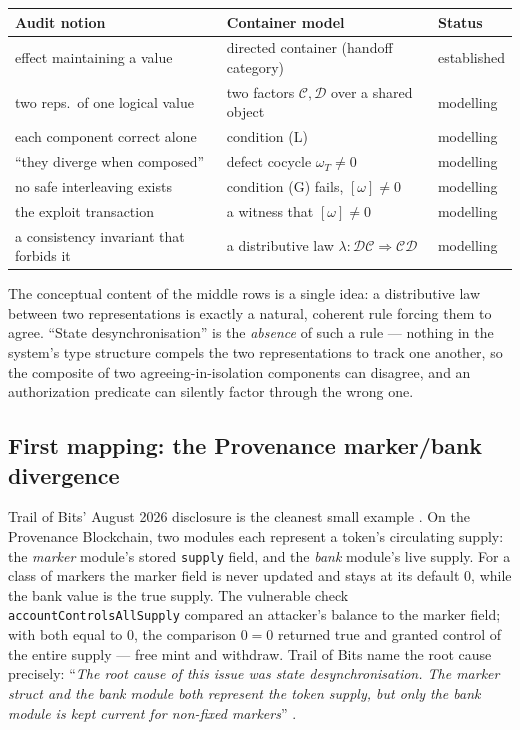 \documentclass[11pt]{amsart}
\theoremstyle{definition}
\theoremstyle{remark}
\newcommand{\C}{\mathcal{C}}
\newcommand{\D}{\mathcal{D}}
\begin{document}
\begin{center}
\begin{tabular}{@{}lll@{}}
\toprule
Audit notion & Container model & Status \\
\midrule
effect maintaining a value & directed container (handoff category) & established \cite{AhmanUustalu} \\
two reps.\ of one logical value & two factors $\C,\D$ over a shared object & modelling \\
each component correct alone & condition (L) & modelling \\
``they diverge when composed'' & defect cocycle $\omega_T\neq 0$ & modelling \\
no safe interleaving exists & condition (G) fails, $[\omega]\neq 0$ & modelling \\
the exploit transaction & a witness that $[\omega]\neq 0$ & modelling \\
a consistency invariant that forbids it & a distributive law $\lambda:\D\C\Rightarrow\C\D$ & modelling \\
\bottomrule
\end{tabular}
\end{center}

The conceptual content of the middle rows is a single idea: a distributive law between two
representations is exactly a natural, coherent rule forcing them to agree. ``State
desynchronisation'' is the \emph{absence} of such a rule --- nothing in the system's type structure
compels the two representations to track one another, so the composite of two agreeing-in-isolation
components can disagree, and an authorization predicate can silently factor through the wrong one.

\subsection*{First mapping: the Provenance marker/bank divergence}
Trail of Bits' August 2026 disclosure is the cleanest small example \cite{tob-statediv}. On the
Provenance Blockchain, two modules each represent a token's circulating supply: the \emph{marker}
module's stored \texttt{supply} field, and the \emph{bank} module's live supply. For a class of
markers the marker field is never updated and stays at its default $0$, while the bank value is the
true supply. The vulnerable check \texttt{accountControlsAllSupply} compared an attacker's balance
to the marker field; with both equal to $0$, the comparison $0=0$ returned true and granted control
of the entire supply --- free mint and withdraw. Trail of Bits name the root cause precisely:
``\emph{The root cause of this issue was state desynchronisation. The marker struct and the bank
module both represent the token supply, but only the bank module is kept current for non-fixed
markers}'' \cite{tob-statediv}.
\end{document}
